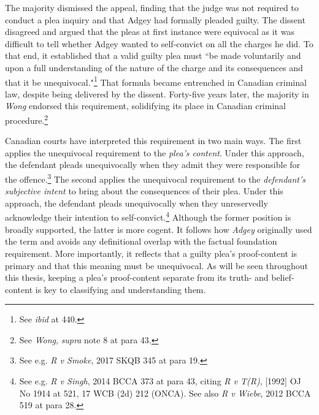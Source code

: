 The majority dismissed the appeal, finding that the judge was not required to conduct a plea inquiry and that Adgey had formally pleaded guilty. The dissent disagreed and argued that the pleas at first instance were equivocal as it was difficult to tell whether Adgey wanted to self-convict on all the charges he did. To that end, it established that a valid guilty plea must ``be made voluntarily and upon a full understanding of the nature of the charge and its consequences and that it be unequivocal."\footnote{See \textit{ibid} at 440.} That formula became entrenched in Canadian criminal law, despite being delivered by the dissent. Forty-five years later, the majority in \textit{Wong} endorsed this requirement, solidifying its place in Canadian criminal procedure.\footnote{See \textit{Wong}, \textit{supra} note 8 at para 43.}

Canadian courts have interpreted this requirement in two main ways. The first applies the unequivocal requirement to the \textit{plea's content}. Under this approach, the defendant pleads unequivocally when they admit they were responsible for the offence.\footnote{See e.g. \textit{R v Smoke}, 2017 SKQB 345 at para 19.} The second applies the unequivocal requirement to the \textit{defendant's subjective intent} to bring about the consequences of their plea. Under this approach, the defendant pleads unequivocally when they unreservedly acknowledge their intention to self-convict.\footnote{See e.g. \textit{R v Singh}, 2014 BCCA 373 at para 43, citing \textit{R v T(R)}, [1992] OJ No 1914 at 521, 17 WCB (2d) 212 (ONCA). See also \textit{R v Wiebe}, 2012 BCCA 519 at para 28.} Although the former position is broadly supported, the latter is more cogent. It follows how \textit{Adgey} originally used the term and avoids any definitional overlap with the factual foundation requirement. More importantly, it reflects that a guilty plea's proof-content is primary and that this meaning must be unequivocal. As will be seen throughout this thesis, keeping a plea's proof-content separate from its truth- and belief-content is key to classifying and understanding them.
